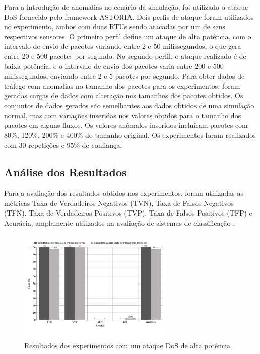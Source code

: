 \documentclass[12pt]{article}
\begin{document}
Para a introdução de anomalias no cenário da simulação, foi utilizado o ataque DoS fornecido pelo framework ASTORIA. Dois perfis de ataque foram utilizados no experimento, ambos com duas RTUs sendo atacadas por um de seus respectivos sensores. O primeiro perfil define um ataque de alta potência, com o intervalo de envio de pacotes variando entre 2 e 50 milissegundos, o que gera entre 20 e 500 pacotes por segundo. No segundo perfil, o ataque realizado é de baixa potência, e o intervalo de envio dos pacotes varia entre 200 e 500 milissegundos, enviando entre 2 e 5 pacotes por segundo. Para obter dados de tráfego com anomalias no tamanho dos pacotes para os experimentos, foram geradas cargas de dados com alteração nos tamanhos dos pacotes obtidos. Os conjuntos de dados gerados são semelhantes aos dados obtidos de uma simulação normal, mas com variações inseridas nos valores obtidos para o tamanho dos pacotes em alguns fluxos. Os valores anômalos inseridos incluíram pacotes com 80\%, 120\%, 200\% e 400\% do tamanho original. Os experimentos foram realizados com 30 repetições e 95\% de confiança.

\subsection{Análise dos Resultados}
\label{sectionresults}

Para a avaliação dos resultados obtidos nos experimentos, foram utilizadas as métricas Taxa de Verdadeiros Negativos (TVN),  Taxa de Falsos Negativos (TFN), Taxa de Verdadeiros Positivos (TVP), Taxa de Falsos Positivos (TFP) e Acurácia, amplamente utilizados na avaliação de sistemas de classificação \cite{nguyen2008survey}.

\begin{figure}[h]
   \caption{Resultados dos experimentos com um ataque DoS de alta potência}
   \begin{center}
       \includegraphics[width=20em]{chartdos1}
   \end{center}
   \label{chartdos1}
\end{figure}
\end{document}
